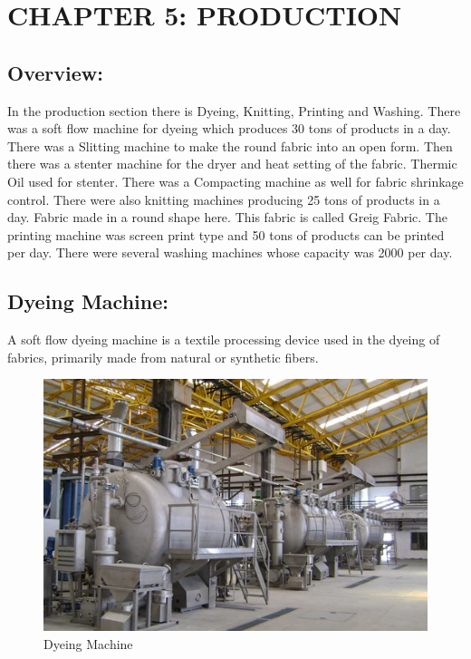 \section{CHAPTER 5: PRODUCTION}

\subsection{Overview:}

In the production section there is Dyeing, Knitting, Printing and Washing. There
was a soft flow machine for dyeing which produces 30 tons of products in
a day. There was a Slitting machine to make the round fabric into an
open form. Then there was a stenter machine for the dryer and heat
setting of the fabric. Thermic Oil used for stenter. There was a
Compacting machine as well for fabric shrinkage control. There were also
knitting machines producing 25 tons of products in a day. Fabric made in
a round shape here. This fabric is called Greig Fabric. The printing
machine was screen print type and 50 tons of products can be printed per
day. There were several washing machines whose capacity was 2000 per
day.\cite{knitting}


\subsection{Dyeing Machine:\cite{dyeing_machines}}

A soft flow dyeing machine is a textile processing device used in the
dyeing of fabrics, primarily made from natural or synthetic fibers.

\begin{figure}[h!]
  \centering
  \includegraphics[width=0.8\linewidth]{figs/production/image1.png}
  \caption{Dyeing Machine}
  \label{fig:Dyeing Machine}
\end{figure}

